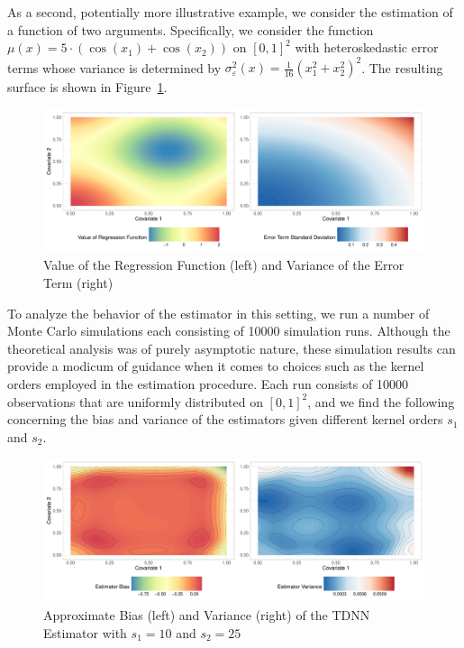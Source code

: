 \newpage
As a second, potentially more illustrative example, we consider the estimation of a function of two arguments.
Specifically, we consider the function $\mu(x) = 5 \cdot \left(\cos(x_1) + \cos(x_2)\right)$ on $[0,1]^2$ with heteroskedastic error terms whose variance is determined by $\sigma_{\varepsilon}^2(x) = \frac{1}{16}\left(x_1^2 + x_2^2\right)^2$.
The resulting surface is shown in Figure~\ref{fig:reg_surface}.

\begin{figure}[H]
	\centering
	\includegraphics[width = \textwidth]{../Graphics/Reg_Exmp1.pdf}
	\caption{Value of the Regression Function (left) and Variance of the Error Term (right)}
	\label{fig:reg_surface}
\end{figure}
To analyze the behavior of the estimator in this setting, we run a number of Monte Carlo simulations each consisting of 10000 simulation runs.
Although the theoretical analysis was of purely asymptotic nature, these simulation results can provide a modicum of guidance when it comes to choices such as the kernel orders employed in the estimation procedure.
Each run consists of 10000 observations that are uniformly distributed on ${[0,1]}^2$, and we find the following concerning the bias and variance of the estimators given different kernel orders $s_1$ and $s_2$.
\begin{figure}[H]
	\centering
	\includegraphics[width = \textwidth]{../Code/Simulations/Graphics/Reg_Exp1/TDNN/Plot_TDNN_n10000s_10_25.RDS.pdf}
	\caption{Approximate Bias (left) and Variance (right) of the TDNN Estimator with $s_1 = 10$ and $s_2 = 25$}
	\label{fig:est_bias_var_2}
\end{figure}
